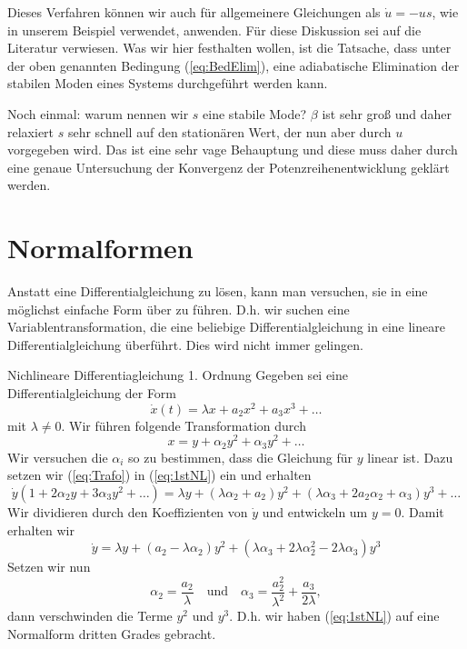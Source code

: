 Dieses Verfahren können wir auch für allgemeinere Gleichungen als $\dot u=-us$,
wie in unserem Beispiel verwendet, anwenden. Für diese Diskussion sei auf die
Literatur verwiesen. Was wir hier festhalten wollen, ist die Tatsache, dass
unter der oben genannten Bedingung (\ref{eq:BedElim}), eine adiabatische
Elimination der stabilen Moden eines Systems durchgeführt werden kann. 

Noch einmal: warum nennen wir $s$ eine stabile Mode? $\beta$ ist sehr groß und
daher relaxiert $s$ sehr schnell auf den stationären Wert, der nun aber durch
$u$ vorgegeben wird. Das ist eine sehr vage Behauptung und diese muss daher
durch eine genaue Untersuchung der Konvergenz der Potenzreihenentwicklung
geklärt werden.
\section{Normalformen}
Anstatt eine Differentialgleichung zu lösen, kann man versuchen, sie in eine möglichst einfache Form über zu führen. D.h. wir suchen eine Variablentransformation, die eine beliebige Differentialgleichung in eine lineare Differentialgleichung überführt. Dies wird nicht immer gelingen.
\begin{example}{Nichlineare Differentiagleichung 1. Ordnung}
  Gegeben sei eine Differentialgleichung der Form
  \begin{equation}\label{eq:1stNL}
  \dot{x}(t)=\lambda x + a_2x^2+a_3x^3+\dots
  \end{equation}
  mit $\lambda\ne 0$. Wir führen folgende Transformation durch
  \begin{equation}\label{eq:Trafo}
  x=y+\alpha_2y^2+\alpha_3y^2+\dots
  \end{equation}
  Wir versuchen die $\alpha_i$ so zu bestimmen, dass die Gleichung für $y$ linear ist. Dazu setzen wir (\ref{eq:Trafo}) in (\ref{eq:1stNL}) ein und erhalten
  \[
  \dot{y}(1+2\alpha_2y+3\alpha_3y^2+\dots)=
  \lambda y+(\lambda\alpha_2+a_2)y^2
  +(\lambda\alpha_3+2a_2\alpha_2+\alpha_3)y^3
  +\dots
  \]
  Wir dividieren durch den Koeffizienten von $\dot{y}$ und entwickeln um $y=0$. Damit erhalten wir
  \[
  \dot{y}=\lambda y+(a_2-\lambda\alpha_2)y^2
  +(\lambda\alpha_3+2\lambda\alpha_2^2
  -2\lambda\alpha_3)y^3
  \]
  Setzen wir nun
  \[
  \alpha_2=\frac{a_2}{\lambda}
  \quad\text{und}\quad
  \alpha_3=\frac{a_2^2}{\lambda^2}+
  \frac{a_3}{2\lambda},
  \]
  dann verschwinden die Terme $y^2$ und $y^3$. D.h. wir haben (\ref{eq:1stNL}) auf eine Normalform dritten Grades gebracht. 
\end{example}

